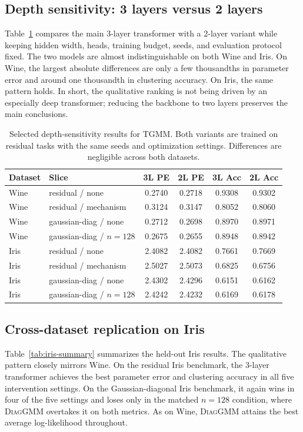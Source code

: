 \documentclass{article}
\newcommand{\diaggmm}{\textsc{DiagGMM}}
\begin{document}
\subsection{Depth sensitivity: 3 layers versus 2 layers}
Table~\ref{tab:depth-sensitivity} compares the main 3-layer transformer with a 2-layer variant while keeping hidden width, heads, training budget, seeds, and evaluation protocol fixed. The two models are almost indistinguishable on both Wine and Iris. On Wine, the largest absolute differences are only a few thousandths in parameter error and around one thousandth in clustering accuracy. On Iris, the same pattern holds. In short, the qualitative ranking is not being driven by an especially deep transformer; reducing the backbone to two layers preserves the main conclusions.

\begin{table}[t]
\centering
\small
\caption{Selected depth-sensitivity results for TGMM. Both variants are trained on residual tasks with the same seeds and optimization settings. Differences are negligible across both datasets.}
\label{tab:depth-sensitivity}
\begin{tabularx}{\linewidth}{llcccc}
\toprule
Dataset & Slice & 3L PE & 2L PE & 3L Acc & 2L Acc \\
\midrule
Wine & residual / none & 0.2740 & 0.2718 & 0.9308 & 0.9302 \\
Wine & residual / mechanism & 0.3124 & 0.3147 & 0.8052 & 0.8060 \\
Wine & gaussian-diag / none & 0.2712 & 0.2698 & 0.8970 & 0.8971 \\
Wine & gaussian-diag / $n{=}128$ & 0.2675 & 0.2655 & 0.8948 & 0.8942 \\
Iris & residual / none & 2.4082 & 2.4082 & 0.7661 & 0.7669 \\
Iris & residual / mechanism & 2.5027 & 2.5073 & 0.6825 & 0.6756 \\
Iris & gaussian-diag / none & 2.4302 & 2.4296 & 0.6151 & 0.6162 \\
Iris & gaussian-diag / $n{=}128$ & 2.4242 & 2.4232 & 0.6169 & 0.6178 \\
\bottomrule
\end{tabularx}
\end{table}

\subsection{Cross-dataset replication on Iris}
Table~\ref{tab:iris-summary} summarizes the held-out Iris results. The qualitative pattern closely mirrors Wine. On the residual Iris benchmark, the 3-layer transformer achieves the best parameter error and clustering accuracy in all five intervention settings. On the Gaussian-diagonal Iris benchmark, it again wins in four of the five settings and loses only in the matched $n=128$ condition, where \diaggmm{} overtakes it on both metrics. As on Wine, \diaggmm{} attains the best average log-likelihood throughout.
\end{document}
